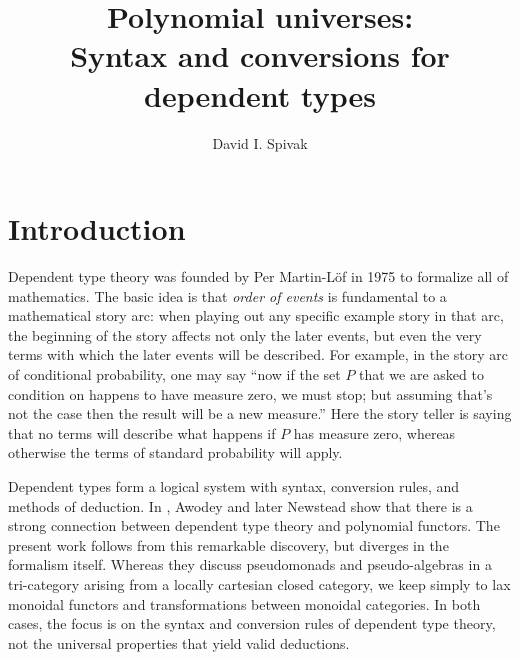 \documentclass[11pt, one side, article]{memoir}
\theoremstyle{definition}
\theoremstyle{plain}
\newcommand{\0}{\textsf{0}}
\newcommand{\1}{\tn{\textsf{1}}}
\begin{document}
\title{Polynomial universes:\\Syntax and conversions for dependent types}

\author{David I. Spivak}

\date{\vspace{-.2in}}

\maketitle

\begin{abstract}
\end{abstract}


\chapter{Introduction}



Dependent type theory \cite{martin-lof1975intuitionistic} was founded by Per Martin-L\"{o}f in 1975 to formalize all of mathematics. The basic idea is that \emph{order of events} is fundamental to a mathematical story arc: when playing out any specific example story in that arc, the beginning of the story affects not only the later events, but even the very terms with which the later events will be described. For example, in the story arc of conditional probability, one may say ``now if the set $P$ that we are asked to condition on happens to have measure zero, we must stop; but assuming that's not the case then the result will be a new measure.'' Here the story teller is saying that no terms will describe what happens if $P$ has measure zero, whereas otherwise the terms of standard probability will apply.

Dependent types form a logical system with syntax, conversion rules, and methods of deduction. In \cite{awodey2014natural,awodey2018polynomial}, Awodey and later Newstead show that there is a strong connection between dependent type theory and polynomial functors. The present work follows from this remarkable discovery, but diverges in the formalism itself. Whereas they discuss pseudomonads and pseudo-algebras in a tri-category arising from a locally cartesian closed category, we keep simply to lax monoidal functors and transformations between monoidal categories. In both cases, the focus is on the syntax and conversion rules of dependent type theory, not the universal properties that yield valid deductions.
\end{document}
